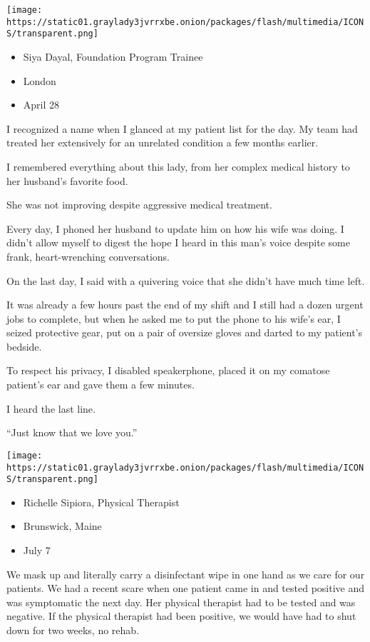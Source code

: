 \texttt{[image: https://static01.graylady3jvrrxbe.onion/packages/flash/multimedia/ICONS/transparent.png]}

\begin{itemize}
\tightlist
\item
  Siya Dayal, Foundation Program Trainee
\item
  London
\item
  April 28
\end{itemize}

I recognized a name when I glanced at my patient list for the day. My
team had treated her extensively for an unrelated condition a few months
earlier.

I remembered everything about this lady, from her complex medical
history to her husband's favorite food.

She was not improving despite aggressive medical treatment.

Every day, I phoned her husband to update him on how his wife was doing.
I didn't allow myself to digest the hope I heard in this man's voice
despite some frank, heart-wrenching conversations.

On the last day, I said with a quivering voice that she didn't have much
time left.

It was already a few hours past the end of my shift and I still had a
dozen urgent jobs to complete, but when he asked me to put the phone to
his wife's ear, I seized protective gear, put on a pair of oversize
gloves and darted to my patient's bedside.

To respect his privacy, I disabled speakerphone, placed it on my
comatose patient's ear and gave them a few minutes.

I heard the last line.

``Just know that we love you.''

\texttt{[image: https://static01.graylady3jvrrxbe.onion/packages/flash/multimedia/ICONS/transparent.png]}

\begin{itemize}
\tightlist
\item
  Richelle Sipiora, Physical Therapist
\item
  Brunswick, Maine
\item
  July 7
\end{itemize}

We mask up and literally carry a disinfectant wipe in one hand as we
care for our patients. We had a recent scare when one patient came in
and tested positive and was symptomatic the next day. Her physical
therapist had to be tested and was negative. If the physical therapist
had been positive, we would have had to shut down for two weeks, no
rehab.

